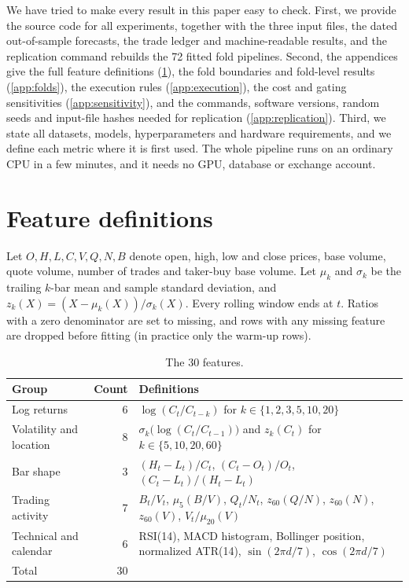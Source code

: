 \documentclass[preprint,12pt,authoryear,a4paper]{elsarticle}
\begin{document}
We have tried to make every result in this paper easy to check. First, we provide
the source code for all experiments, together with the three input files, the dated
out-of-sample forecasts, the trade ledger and machine-readable results, and the
replication command rebuilds the 72 fitted fold pipelines. Second, the appendices
give the full feature definitions (\ref{app:features}), the fold boundaries and
fold-level results (\ref{app:folds}), the execution rules (\ref{app:execution}),
the cost and gating sensitivities (\ref{app:sensitivity}), and the commands,
software versions, random seeds and input-file hashes needed for replication
(\ref{app:replication}). Third, we state all datasets, models, hyperparameters and
hardware requirements, and we define each metric where it is first used. The whole
pipeline runs on an ordinary CPU in a few minutes, and it needs no GPU, database or
exchange account.

\appendix

\section{Feature definitions}\label{app:features}

Let $O,H,L,C,V,Q,N,B$ denote open, high, low and close prices, base volume, quote
volume, number of trades and taker-buy base volume. Let $\mu_k$ and $\sigma_k$ be
the trailing $k$-bar mean and sample standard deviation, and
$z_k(X)=(X-\mu_k(X))/\sigma_k(X)$. Every rolling window ends at $t$. Ratios with a
zero denominator are set to missing, and rows with any missing feature are dropped
before fitting (in practice only the warm-up rows).

\begin{table}[H]\centering\small
\caption{The 30 features.}
\label{tab:features}
\begin{tabular}{@{}L{0.22\textwidth}rL{0.62\textwidth}@{}}
\toprule
Group & Count & Definitions \\
\midrule
Log returns & 6 & $\log(C_t/C_{t-k})$ for $k\in\{1,2,3,5,10,20\}$ \\
Volatility and location & 8 & $\sigma_k\bigl(\log(C_t/C_{t-1})\bigr)$ and $z_k(C_t)$ for $k\in\{5,10,20,60\}$ \\
Bar shape & 3 & $(H_t-L_t)/C_t$, $(C_t-O_t)/O_t$, $(C_t-L_t)/(H_t-L_t)$ \\
Trading activity & 7 & $B_t/V_t$, $\mu_5(B/V)$, $Q_t/N_t$, $z_{60}(Q/N)$, $z_{60}(N)$, $z_{60}(V)$, $V_t/\mu_{20}(V)$ \\
Technical and calendar & 6 & RSI(14), MACD histogram, Bollinger position, normalized ATR(14), $\sin(2\pi d/7)$, $\cos(2\pi d/7)$ \\
\midrule
Total & 30 & \\
\bottomrule
\end{tabular}
\end{table}
\end{document}
